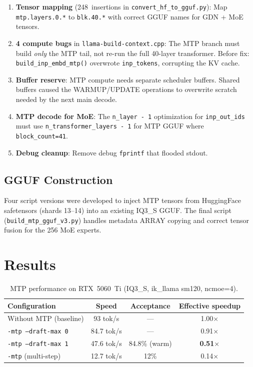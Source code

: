 \documentclass[10pt,a4paper]{article}
\begin{document}
\begin{enumerate}
  \item \textbf{Tensor mapping} (248~insertions in \texttt{convert\_hf\_to\_gguf.py}): Map \texttt{mtp.layers.0.*} to \texttt{blk.40.*} with correct GGUF names for GDN + MoE tensors.
  \item \textbf{4 compute bugs} in \texttt{llama-build-context.cpp}: The MTP branch must build \emph{only} the MTP tail, not re-run the full 40-layer transformer. Before fix: \texttt{build\_inp\_embd\_mtp()} overwrote \texttt{inp\_tokens}, corrupting the KV cache.
  \item \textbf{Buffer reserve}: MTP compute needs separate scheduler buffers. Shared buffers caused the WARMUP/UPDATE operations to overwrite scratch needed by the next main decode.
  \item \textbf{MTP decode for MoE}: The \texttt{n\_layer - 1} optimization for \texttt{inp\_out\_ids} must use \texttt{n\_transformer\_layers - 1} for MTP GGUF where \texttt{block\_count=41}.
  \item \textbf{Debug cleanup}: Remove debug \texttt{fprintf} that flooded stdout.
\end{enumerate}

\subsection{GGUF Construction}

Four script versions were developed to inject MTP tensors from HuggingFace safetensors (shards 13--14) into an existing IQ3\_S GGUF. The final script (\texttt{build\_mtp\_gguf\_v3.py}) handles metadata ARRAY copying and correct tensor fusion for the 256 MoE experts.

\section{Results}

\begin{table}[h]
\centering
\caption{MTP performance on RTX~5060~Ti (IQ3\_S, ik\_llama sm120, ncmoe=4).}
\begin{tabular}{lccc}
\toprule
\textbf{Configuration} & \textbf{Speed} & \textbf{Acceptance} & \textbf{Effective speedup} \\
\midrule
Without MTP (baseline) & 93 tok/s & --- & 1.00$\times$ \\
\texttt{-mtp --draft-max 0} & 84.7 tok/s & --- & 0.91$\times$ \\
\texttt{-mtp --draft-max 1} & 47.6 tok/s & 84.8\% (warm) & \textbf{0.51$\times$} \\
\texttt{-mtp} (multi-step) & 12.7 tok/s & 12\% & 0.14$\times$ \\
\bottomrule
\end{tabular}
\end{table}
\end{document}
